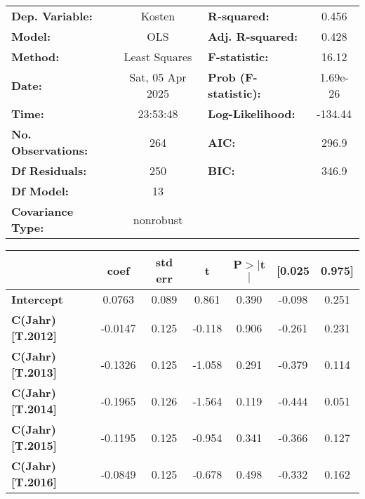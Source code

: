 \begin{center}
\begin{tabular}{lclc}
\toprule
\textbf{Dep. Variable:}    &      Kosten      & \textbf{  R-squared:         } &     0.456   \\
\textbf{Model:}            &       OLS        & \textbf{  Adj. R-squared:    } &     0.428   \\
\textbf{Method:}           &  Least Squares   & \textbf{  F-statistic:       } &     16.12   \\
\textbf{Date:}             & Sat, 05 Apr 2025 & \textbf{  Prob (F-statistic):} &  1.69e-26   \\
\textbf{Time:}             &     23:53:48     & \textbf{  Log-Likelihood:    } &   -134.44   \\
\textbf{No. Observations:} &         264      & \textbf{  AIC:               } &     296.9   \\
\textbf{Df Residuals:}     &         250      & \textbf{  BIC:               } &     346.9   \\
\textbf{Df Model:}         &          13      & \textbf{                     } &             \\
\textbf{Covariance Type:}  &    nonrobust     & \textbf{                     } &             \\
\bottomrule
\end{tabular}
\begin{tabular}{lcccccc}
                         & \textbf{coef} & \textbf{std err} & \textbf{t} & \textbf{P$> |$t$|$} & \textbf{[0.025} & \textbf{0.975]}  \\
\midrule
\textbf{Intercept}       &       0.0763  &        0.089     &     0.861  &         0.390        &       -0.098    &        0.251     \\
\textbf{C(Jahr)[T.2012]} &      -0.0147  &        0.125     &    -0.118  &         0.906        &       -0.261    &        0.231     \\
\textbf{C(Jahr)[T.2013]} &      -0.1326  &        0.125     &    -1.058  &         0.291        &       -0.379    &        0.114     \\
\textbf{C(Jahr)[T.2014]} &      -0.1965  &        0.126     &    -1.564  &         0.119        &       -0.444    &        0.051     \\
\textbf{C(Jahr)[T.2015]} &      -0.1195  &        0.125     &    -0.954  &         0.341        &       -0.366    &        0.127     \\
\textbf{C(Jahr)[T.2016]} &      -0.0849  &        0.125     &    -0.678  &         0.498        &       -0.332    &        0.162     \\

\end{tabular}
\end{center}
